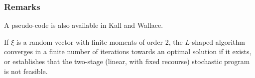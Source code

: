 \documentclass{beamer}
\def\bxi{\boldsymbol\xi}
\begin{document}
\begin{frame}
\frametitle{Remarks}

A pseudo-code is also available in Kall and Wallace.
	
	
	

\mbox{}
	
\begin{theorem}
If $\xi$ is a random vector with finite moments of order 2, the	$L$-shaped algorithm converges in a finite number of iterations towards an optimal solution if it exists, or establishes that the two-stage (linear, with fixed recourse) stochastic program is not feasible.
\end{theorem}
	
\end{frame}

	

	



	
	
\end{document}
